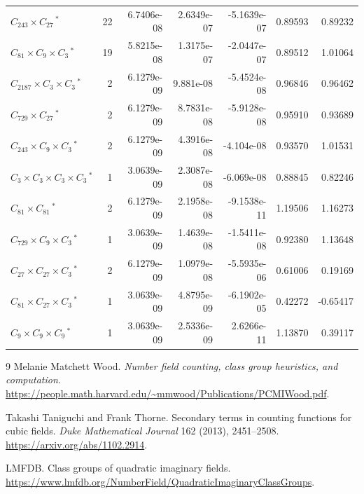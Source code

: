 \documentclass[11pt]{article}
\begin{document}
\begin{longtable}{@{}lrrrrrr@{}}
\(C_{243}\!\times\!C_{27}\,{}^{*}\) & 22 & 6.7406e-08 & 2.6349e-07 & -5.1639e-07 & 0.89593 & 0.89232 \\
\(C_{81}\!\times\!C_{9}\!\times\!C_{3}\,{}^{*}\) & 19 & 5.8215e-08 & 1.3175e-07 & -2.0447e-07 & 0.89512 & 1.01064 \\
\(C_{2187}\!\times\!C_{3}\!\times\!C_{3}\,{}^{*}\) & 2 & 6.1279e-09 & 9.881e-08 & -5.4524e-08 & 0.96846 & 0.96462 \\
\(C_{729}\!\times\!C_{27}\,{}^{*}\) & 2 & 6.1279e-09 & 8.7831e-08 & -5.9128e-08 & 0.95910 & 0.93689 \\
\(C_{243}\!\times\!C_{9}\!\times\!C_{3}\,{}^{*}\) & 2 & 6.1279e-09 & 4.3916e-08 & -4.104e-08 & 0.93570 & 1.01531 \\
\(C_{3}\!\times\!C_{3}\!\times\!C_{3}\!\times\!C_{3}\,{}^{*}\) & 1 & 3.0639e-09 & 2.3087e-08 & -6.069e-08 & 0.88845 & 0.82246 \\
\(C_{81}\!\times\!C_{81}\,{}^{*}\) & 2 & 6.1279e-09 & 2.1958e-08 & -9.1538e-11 & 1.19506 & 1.16273 \\
\(C_{729}\!\times\!C_{9}\!\times\!C_{3}\,{}^{*}\) & 1 & 3.0639e-09 & 1.4639e-08 & -1.5411e-08 & 0.92380 & 1.13648 \\
\(C_{27}\!\times\!C_{27}\!\times\!C_{3}\,{}^{*}\) & 2 & 6.1279e-09 & 1.0979e-08 & -5.5935e-06 & 0.61006 & 0.19169 \\
\(C_{81}\!\times\!C_{27}\!\times\!C_{3}\,{}^{*}\) & 1 & 3.0639e-09 & 4.8795e-09 & -6.1902e-05 & 0.42272 & -0.65417 \\
\(C_{9}\!\times\!C_{9}\!\times\!C_{9}\,{}^{*}\) & 1 & 3.0639e-09 & 2.5336e-09 & 2.6266e-11 & 1.13870 & 0.39117 \\
\end{longtable}
\endgroup

\begin{thebibliography}{9}
 Melanie Matchett Wood.
\emph{Number field counting, class group heuristics, and computation}.
\url{https://people.math.harvard.edu/~mmwood/Publications/PCMIWood.pdf}.

 Takashi Taniguchi and Frank Thorne.
Secondary terms in counting functions for cubic fields.
\emph{Duke Mathematical Journal} 162 (2013), 2451--2508.
\url{https://arxiv.org/abs/1102.2914}.

 LMFDB. Class groups of quadratic imaginary fields.
\url{https://www.lmfdb.org/NumberField/QuadraticImaginaryClassGroups}.
\end{thebibliography}
\end{document}
